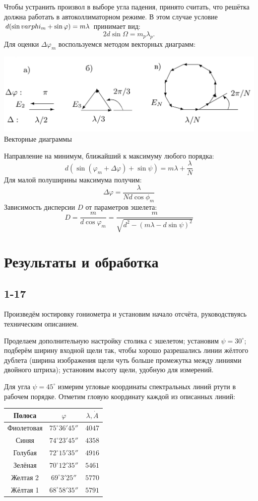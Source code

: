 Чтобы устранить произвол в выборе угла падения, принято считать, что решётка должна работать в автоколлиматорном режиме. В этом случае условие $d(\sin \\varphi_m + \sin \varphi) = m \lambda$ принимает вид:
\[
    2d \sin \Omega = m_p \lambda_p.
\]
Для оценки $\Delta \varphi_m$ воспользуемся методом векторных диаграмм:
\begin{center}
    \includegraphics[width = 1.0\linewidth]{2.png}
    {Векторные диаграммы}
\end{center}
Направление на минимум, ближайший к максимуму любого порядка:
\[
d(\sin(\varphi_m + \Delta \varphi) + \sin \psi) = m \lambda + \frac{\lambda}{N}
\]
Для малой полуширины максимума получим:
\[
\Delta \varphi = \frac{\lambda}{Nd\cos \phi_m}
\]
Зависимость дисперсии $D$ от параметров эшелета:
\[
D = \frac{m}{d \cos \varphi_m} = \frac{m}{\sqrt{d^2 - (m \lambda - d \sin \psi)^2}}
\]

\section*{Результаты и обработка}
\subsection{1-17}
Произведём юстировку гониометра и установим начало отсчёта, руководствуясь техническим описанием.

Проделаем дополнительную настройку столика с эшелетом; установим $\psi = 30^\circ$; подберём ширину входной щели так, чтобы хорошо разрешались линии жёлтого дублета (ширина изображения щели чуть больше промежутка между линиями двойного штриха); установим высоту щели, удобную для измерений.

Для угла $\psi = 45^\circ$ измерим угловые координаты спектральных линий ртути в рабочем порядке. Отметим гловую координату каждой из описанных линий:\\
\begin{center}
\begin{tabular}{|c|c|c|}  \hline
Полоса         & $\varphi          $ & $\lambda, \dot A$ \\\hline
Фиолетовая     & $75^\circ 36' 45''$ & $4047$ \\\hline
Синяя          & $74^\circ 23' 45''$ & $4358$ \\\hline
Голубая        & $72^\circ 15' 35''$ & $4916$ \\\hline
Зелёная        & $70^\circ 12' 35''$ & $5461$ \\\hline
Желтая 2       & $69^\circ 3 ' 25''$ & $5770$ \\\hline
Жёлтая 1       & $68^\circ 58' 35''$ & $5791$ \\\hline
\end{tabular}
\end{center}

